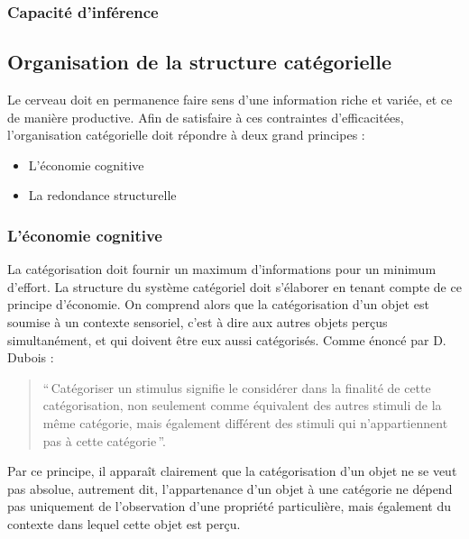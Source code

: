 \subsubsection{Capacité d'inférence}

\subsection{Organisation de la structure catégorielle}

Le cerveau doit en permanence faire sens d'une information riche et variée, et ce de manière productive. Afin de satisfaire à ces contraintes d'efficacitées, l'organisation catégorielle doit répondre à deux grand principes \citep[p. 29]{rosch1978cognition}:

\begin{itemize}
\item L'économie cognitive
\item La redondance structurelle
\end{itemize}

\subsubsection{L'économie cognitive}

La catégorisation doit fournir un maximum d'informations pour un minimum d'effort. La structure du système catégoriel doit s'élaborer en tenant compte de ce principe d'économie. On comprend alors que la catégorisation d'un objet est soumise à un contexte sensoriel, c'est à dire aux autres objets perçus simultanément, et qui doivent être eux aussi catégorisés. Comme énoncé par D. Dubois \citep[p. 33]{dubois1991semantique}:

\begin{quote}
``\,Catégoriser un stimulus signifie le considérer dans la finalité de cette catégorisation, non seulement comme équivalent des autres stimuli de la même catégorie, mais également différent des stimuli qui n'appartiennent pas à cette catégorie\,''.
\end{quote}

Par ce principe, il apparaît clairement que la catégorisation d'un objet ne se veut pas absolue, autrement dit, l'appartenance d'un objet à une catégorie ne dépend pas uniquement de l'observation d'une propriété particulière, mais également du contexte dans lequel cette objet est perçu.

